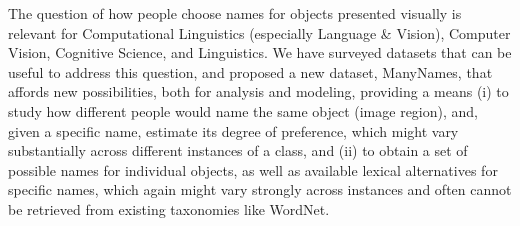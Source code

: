 

The question of how people choose names for objects presented visually is relevant for Computational Linguistics (especially Language \& Vision), Computer Vision, Cognitive Science, and Linguistics.
We have surveyed datasets that can be useful to address this question, and proposed a new dataset, ManyNames, that affords new possibilities, both for analysis and modeling, providing a means
(i) to study how different people would name the same object (image region), and, given a specific name, estimate its degree of preference, which might vary substantially across different instances of a class, and   
(ii) to obtain a set of possible names for individual objects, as well as available lexical alternatives for specific names, which again might vary strongly across instances and often cannot be retrieved from existing taxonomies like WordNet. 

